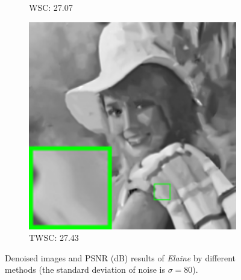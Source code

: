 \begin{figure}
\begin{adjustwidth}{-2cm}{}
\begin{subfigure}[t]{0.19\textwidth}
		\caption{WSC: 27.07}
    \end{subfigure}
    \hfill
    \begin{subfigure}[t]{0.19\textwidth}
        \centering
        \includegraphics[width=1\textwidth]{images/twsc/awgn/resize_br_WLSWSC_80_elaine.png}
		\caption{TWSC: 27.43}
    \end{subfigure}
    \caption{Denoised images and PSNR (dB) results of \textsl{Elaine} by different methods (the standard deviation of noise is $\sigma=80$).}
    \label{fig5-5}
\end{adjustwidth}
\end{figure}

